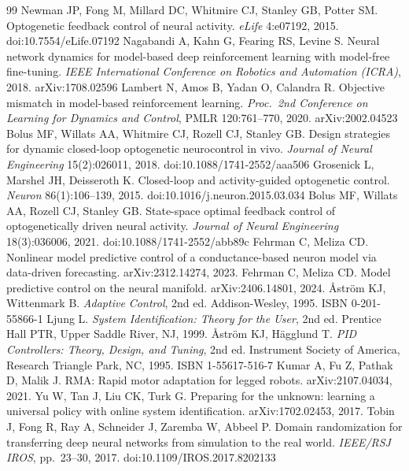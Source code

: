 \documentclass[11pt]{article}
\begin{document}
\begin{thebibliography}{99}\small
{} Newman JP, Fong M, Millard DC, Whitmire CJ, Stanley GB, Potter SM. Optogenetic feedback control of neural activity. \emph{eLife} 4:e07192, 2015. doi:10.7554/eLife.07192
 Nagabandi A, Kahn G, Fearing RS, Levine S. Neural network dynamics for model-based deep reinforcement learning with model-free fine-tuning. \emph{IEEE International Conference on Robotics and Automation (ICRA)}, 2018. arXiv:1708.02596
 Lambert N, Amos B, Yadan O, Calandra R. Objective mismatch in model-based reinforcement learning. \emph{Proc.\ 2nd Conference on Learning for Dynamics and Control}, PMLR 120:761--770, 2020. arXiv:2002.04523
 Bolus MF, Willats AA, Whitmire CJ, Rozell CJ, Stanley GB. Design strategies for dynamic closed-loop optogenetic neurocontrol in vivo. \emph{Journal of Neural Engineering} 15(2):026011, 2018. doi:10.1088/1741-2552/aaa506
 Grosenick L, Marshel JH, Deisseroth K. Closed-loop and activity-guided optogenetic control. \emph{Neuron} 86(1):106--139, 2015. doi:10.1016/j.neuron.2015.03.034
 Bolus MF, Willats AA, Rozell CJ, Stanley GB. State-space optimal feedback control of optogenetically driven neural activity. \emph{Journal of Neural Engineering} 18(3):036006, 2021. doi:10.1088/1741-2552/abb89c
 Fehrman C, Meliza CD. Nonlinear model predictive control of a conductance-based neuron model via data-driven forecasting. arXiv:2312.14274, 2023.
 Fehrman C, Meliza CD. Model predictive control on the neural manifold. arXiv:2406.14801, 2024.
 {\AA}str{\"o}m KJ, Wittenmark B. \emph{Adaptive Control}, 2nd ed. Addison-Wesley, 1995. ISBN 0-201-55866-1
 Ljung L. \emph{System Identification: Theory for the User}, 2nd ed. Prentice Hall PTR, Upper Saddle River, NJ, 1999.
 {\AA}str{\"o}m KJ, H{\"a}gglund T. \emph{PID Controllers: Theory, Design, and Tuning}, 2nd ed. Instrument Society of America, Research Triangle Park, NC, 1995. ISBN 1-55617-516-7
 Kumar A, Fu Z, Pathak D, Malik J. RMA: Rapid motor adaptation for legged robots. arXiv:2107.04034, 2021.
 Yu W, Tan J, Liu CK, Turk G. Preparing for the unknown: learning a universal policy with online system identification. arXiv:1702.02453, 2017.
 Tobin J, Fong R, Ray A, Schneider J, Zaremba W, Abbeel P. Domain randomization for transferring deep neural networks from simulation to the real world. \emph{IEEE/RSJ IROS}, pp.\ 23--30, 2017. doi:10.1109/IROS.2017.8202133

\end{thebibliography}
\end{document}
